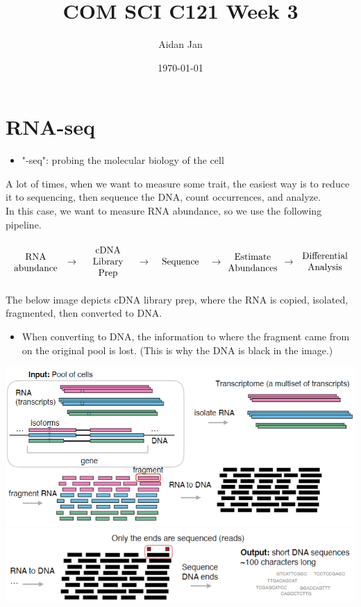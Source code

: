 \documentclass[10pt]{article}
\title{COM SCI C121 Week 3}
\author{Aidan Jan}
\date{\today}
\begin{document}
\maketitle
\section*{RNA-seq}
\begin{itemize}
    \item "-seq": probing the molecular biology of the cell
\end{itemize}
A lot of times, when we want to measure some trait, the easiest way is to reduce it to sequencing, then sequence the DNA, count occurrences, and analyze.\\
In this case, we want to measure RNA abundance, so we use the following pipeline.
\[
    \parbox{0.18\textwidth}{\begin{center}
        RNA abundance \end{center}
    } \rightarrow
    \parbox{0.18\textwidth}{\begin{center}
        cDNA Library \\Prep \end{center}
    } \rightarrow
    \parbox{0.18\linewidth}{\begin{center}
        Sequence \end{center}
    } \rightarrow
    \parbox{0.18\linewidth}{\begin{center}
        Estimate \\Abundances \end{center}
    } \rightarrow
    \parbox{0.18\linewidth}{\begin{center}
        Differential Analysis \end{center}
    }
\]
The below image depicts cDNA library prep, where the RNA is copied, isolated, fragmented, then converted to DNA.
\begin{itemize}
    \item When converting to DNA, the information to where the fragment came from on the original pool is lost.  (This is why the DNA is black in the image.)
\end{itemize}
\begin{center}
    \includegraphics*[scale=1]{W3_1.png}\\
    \includegraphics*[scale=1]{W3_2.png}
\end{center}
\end{document}
